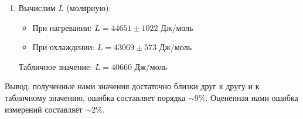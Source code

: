 \documentclass[12pt,a4paper]{article}
\begin{document}
\begin{enumerate}
		\item Вычислим $L$ (молярную):
			\begin{itemize}
				\item При нагревании: $L = 44651 \pm 1022$ Дж/моль
				\item При охлаждении: $L = 43069 \pm 573$ Дж/моль
			\end{itemize}
			
		Табличное значение: $L = 40660$ Дж/моль
	\end{enumerate}
	
	Вывод: полученные нами значения достаточно близки друг к другу и к табличному значению, ошибка составляет порядка $\sim 9\%$. Оцененная нами ошибка измерений составляет $\sim 2\%$.
\end{document}
